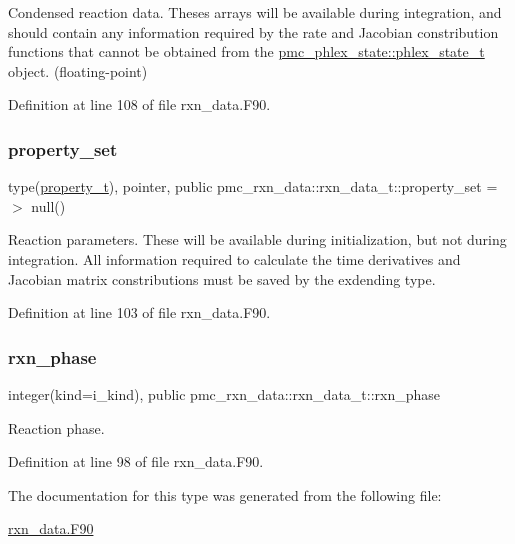 Condensed reaction data. Theses arrays will be available during integration, and should contain any information required by the rate and Jacobian constribution functions that cannot be obtained from the {\ttfamily \mbox{\hyperlink{structpmc__phlex__state_1_1phlex__state__t}{pmc\+\_\+phlex\+\_\+state\+::phlex\+\_\+state\+\_\+t}}} object. (floating-\/point) 



Definition at line 108 of file rxn\+\_\+data.\+F90.

\mbox{\label{structpmc__rxn__data_1_1rxn__data__t_a1e41bfcf13269629b6b7343d9a377580}} 
\subsubsection{\texorpdfstring{property\+\_\+set}{property\_set}}
{\footnotesize\ttfamily type(\mbox{\hyperlink{structpmc__property_1_1property__t}{property\+\_\+t}}), pointer, public pmc\+\_\+rxn\+\_\+data\+::rxn\+\_\+data\+\_\+t\+::property\+\_\+set =$>$ null()}



Reaction parameters. These will be available during initialization, but not during integration. All information required to calculate the time derivatives and Jacobian matrix constributions must be saved by the exdending type. 



Definition at line 103 of file rxn\+\_\+data.\+F90.

\mbox{\label{structpmc__rxn__data_1_1rxn__data__t_a083493c401265afb142cfb7b2799348e}} 
\subsubsection{\texorpdfstring{rxn\+\_\+phase}{rxn\_phase}}
{\footnotesize\ttfamily integer(kind=i\+\_\+kind), public pmc\+\_\+rxn\+\_\+data\+::rxn\+\_\+data\+\_\+t\+::rxn\+\_\+phase}



Reaction phase. 



Definition at line 98 of file rxn\+\_\+data.\+F90.



The documentation for this type was generated from the following file\+:\begin{DoxyCompactItemize}
\item 
\mbox{\hyperlink{rxn__data_8_f90}{rxn\+\_\+data.\+F90}}\end{DoxyCompactItemize}
